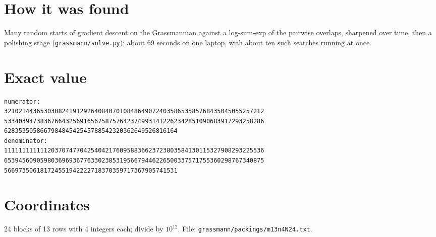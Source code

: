 \documentclass[11pt,a4paper]{article}
\begin{document}
\section{How it was found}
Many random starts of gradient descent on the Grassmannian against a log-sum-exp of the pairwise overlaps, sharpened over time, then a polishing stage (\texttt{grassmann/solve.py}); about 69 seconds on one laptop, with about ten such searches running at once.


\appendix
\section{Exact value}
{\small
\begin{verbatim}
numerator:
321021443653030824191292640840701084864907240358653585768435045055257212
533403947383676643256916567587576423749931412262342851090683917293258286
628353505866798484542545788542320362649526816164
denominator:
111111111111203707477042540421760958836623723803584130115327908293225536
653945609059803696936776330238531956679446226500337571755360298767340875
566973506181724551942222718370359717367905741531
\end{verbatim}}

\section{Coordinates}
24 blocks of 13 rows with 4 integers each; divide by $10^{12}$. File: \texttt{grassmann/packings/m13n4N24.txt}.
{\tiny
\begin{multicols}{3}
\end{multicols}}
\end{document}

